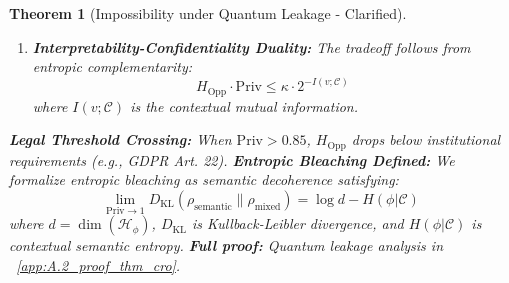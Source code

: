 \documentclass[preprint,12pt]{elsarticle}
\newtheorem{theorem}{Theorem}[section]
\begin{document}
\begin{theorem}[Impossibility under Quantum Leakage - Clarified]
\begin{enumerate}
                    \item \textbf{Interpretability-Confidentiality Duality:}
                    The tradeoff follows from entropic complementarity:
                    \[
                    H_{\text{Opp}} \cdot \mathrm{Priv} \leq \kappa \cdot 2^{-I(v;\mathcal{C})}
                    \]
                    where $I(v;\mathcal{C})$ is the contextual mutual information.
                \end{enumerate}
            
                \begin{center}
                \end{center}
                \textbf{Legal Threshold Crossing:} When $\mathrm{Priv} > 0.85$, $H_{\text{Opp}}$ drops below institutional requirements (e.g., GDPR Art. 22).
                \textbf{Entropic Bleaching Defined:} We formalize \textit{entropic bleaching} as semantic decoherence satisfying:
                    \[    \lim_{\mathrm{Priv} \to 1} D_{\text{KL}}(\rho_{\text{semantic}} \| \rho_{\text{mixed}}) = \log d - H(\phi|\mathcal{C})
                    \]
                    where $d = \dim(\mathcal{H}_\phi)$, $D_{\text{KL}}$ is Kullback-Leibler divergence, and $H(\phi|\mathcal{C})$ is contextual semantic entropy.
                \textbf{Full proof:} Quantum leakage analysis in ~\ref{app:A.2_proof_thm_cro}.
            \end{theorem}
\end{document}
